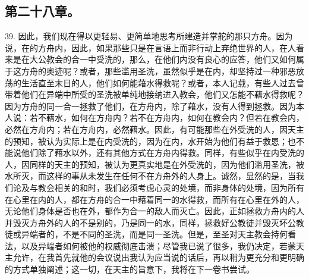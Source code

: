 
\subsection{第二十八章。}

39. 因此，我们现在得以更轻易、更简单地思考所建造并掌舵的那只方舟。因为说，在的方舟内，因此，如果那些只是在言语上而非行动上弃绝世界的人，在人看来是在大公教会的合一中受洗的，那么，在他们内没有良心的应答，他们又如何属于这方舟的奥迹呢？或者，那些滥用圣洗，虽然似乎是在内，却坚持过一种邪恶放荡的生活直至末日的人，他们如何能藉水得救呢？或者，本人记载，有些人过去曾带着他们在异端中所受的圣洗被单纯地接纳进入教会，他们又怎能不藉水得救呢？因为方舟的同一合一拯救了他们，在方舟内，除了藉水，没有人得到拯救。因为本人说：若不藉水，如何在方舟内？若不在方舟内，如何在教会内？但若在教会内，必然在方舟内；若在方舟内，必然藉水。因此，有可能那些在外受洗的人，因天主的预知，被认为实际上是在内受洗的，因为在内，水开始为他们有益于救恩；也不能说他们除了藉水以外，还有其他方式在方舟内得救。同样，有些似乎在内受洗的人，因同样的天主的预知，被认为更真实地是在外受洗的，因为他们滥用圣洗，被水所灭，而这样的事从未发生在任何不在方舟外的人身上。诚然，显然的是，当我们论及与教会相关的和时，我们必须考虑心灵的处境，而非身体的处境，因为所有在心里在内的人，都在方舟的合一中藉着同一的水得救，而所有在心里在外的人，无论他们身体是否也在外，都作为合一的敌人而灭亡。因此，正如拯救方舟内的人并毁灭方舟外的人的不是别的，乃是同一的水，同样，拯救好公教徒并毁灭坏公教徒或异端者的，不是不同的圣洗，而是同一圣洗。但是，至圣对天主教会持何看法，以及异端者如何被他的权威彻底击溃；尽管我已说了很多，我仍决定，若蒙天主允许，在我首先就他的会议说出我认为应当说的话后，再以稍为更充分和更明确的方式单独阐述；这一切，在天主的旨意下，我将在下一卷书尝试。\par


